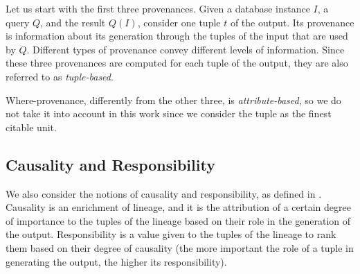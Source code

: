 \documentclass[preprint,12pt,sort&compress]{elsarticle}
\begin{document}
Let us start with the first three provenances. Given a database instance $I$, a query $Q$, and the result $Q(I)$, consider one tuple $t$ of the output. 
Its provenance is information about its generation through the tuples of the input that are used by $Q$. Different types of provenance convey different levels of information. Since these three provenances are computed for each tuple of the output, they are also referred to as \emph{tuple-based}.

%
%
%

Where-provenance, differently from the other three, is \emph{attribute-based}, so we do not take it into account in this work since we consider the tuple as the finest citable unit. 

\subsection{Causality and Responsibility}
We also consider the notions of causality and responsibility, as defined in 
\cite{MeliouGMS11}. Causality is an enrichment of lineage, and it is the attribution of a certain degree of importance to the tuples of the lineage based on their role in the generation of the output. Responsibility is a value given to the tuples of the lineage to rank them based on their degree of causality (the more important the role of a tuple in generating the output, the higher its responsibility).
\end{document}

